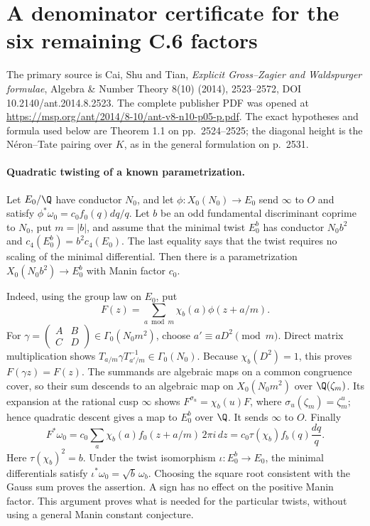 \section*{A denominator certificate for the six remaining C.6 factors}

The primary source is Cai, Shu and Tian, \emph{Explicit Gross--Zagier and
Waldspurger formulae}, Algebra \& Number Theory 8(10) (2014), 2523--2572,
DOI 10.2140/ant.2014.8.2523. The complete publisher PDF was opened at
\url{https://msp.org/ant/2014/8-10/ant-v8-n10-p05-p.pdf}.
The exact hypotheses and formula used below are Theorem 1.1 on
pp.~2524--2525; the diagonal height is the N\'eron--Tate pairing over
$K$, as in the general formulation on p.~2531.

\paragraph{Quadratic twisting of a known parametrization.}
Let $E_0/\Q$ have conductor $N_0$, and let
$\phi:X_0(N_0)\to E_0$ send $\infty$ to $O$ and satisfy
$\phi^*\omega_0=c_0 f_0(q)dq/q$. Let $b$ be an odd fundamental
discriminant coprime to $N_0$, put $m=|b|$, and assume that the minimal
twist $E_0^b$ has conductor $N_0b^2$ and
$c_4(E_0^b)=b^2c_4(E_0)$. The last equality says that the twist
requires no scaling of the minimal differential. Then there is a
parametrization $X_0(N_0b^2)\to E_0^b$ with Manin factor $c_0$.

Indeed, using the group law on $E_0$, put
\[
 F(z)=\sum_{a\bmod m}\chi_b(a)\phi(z+a/m).
\]
For $\gamma=\left(\begin{smallmatrix}A&B\\C&D\end{smallmatrix}\right)
\in\Gamma_0(N_0m^2)$, choose $a'\equiv aD^2\pmod m$. Direct
matrix multiplication shows
$T_{a/m}\gamma T_{a'/m}^{-1}\in\Gamma_0(N_0)$.
Because $\chi_b(D^2)=1$, this proves $F(\gamma z)=F(z)$.
The summands are algebraic maps on a common congruence cover, so their
sum descends to an algebraic map on $X_0(N_0m^2)$ over
$\Q(\zeta_m)$. Its expansion at the rational cusp $\infty$ shows
$F^{\sigma_u}=\chi_b(u)F$, where
$\sigma_u(\zeta_m)=\zeta_m^u$; hence quadratic descent gives a map
to $E_0^b$ over $\Q$. It sends $\infty$ to $O$. Finally
\[
 F^*\omega_0=c_0\sum_a\chi_b(a)f_0(z+a/m)\,2\pi i\,dz
 =c_0\tau(\chi_b)f_b(q)\frac{dq}{q}.
\]
Here $\tau(\chi_b)^2=b$. Under the twist isomorphism
$\iota:E_0^b\to E_0$, the minimal differentials satisfy
$\iota^*\omega_0=\sqrt b\,\omega_b$. Choosing the square root
consistent with the Gauss sum proves the assertion. A sign has no
effect on the positive Manin factor. This argument proves what is
needed for the particular twists, without using a general Manin
constant conjecture.

